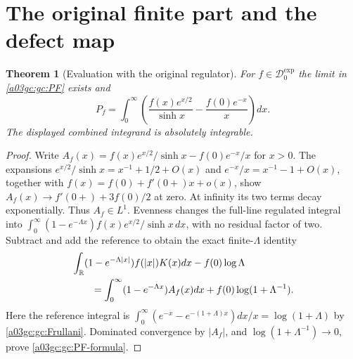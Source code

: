\documentclass[11pt,a4paper]{article}
\newtheorem{theorem}{Theorem}[section]
\begin{document}
\section{The original finite part and the defect map}

\begin{theorem}[Evaluation with the original regulator]
For $f\in\mathcal D_0^{\exp}$ the limit in \eqref{a03gc:gc:PF} exists and
\begin{equation}
 \boxed{\displaystyle
 P_f=\int_0^\infty\left(
       \frac{f(x)e^{x/2}}{\sinh x}-\frac{f(0)e^{-x}}{x}\right)dx.}
 \label{a03gc:gc:PF-formula}
\end{equation}
The displayed combined integrand is absolutely integrable.
\end{theorem}
\begin{proof}
Write $A_f(x)=f(x)e^{x/2}/\sinh x-f(0)e^{-x}/x$ for $x>0$.
The expansions
$e^{x/2}/\sinh x=x^{-1}+1/2+O(x)$ and
$e^{-x}/x=x^{-1}-1+O(x)$, together with
$f(x)=f(0)+f'(0+)x+o(x)$, show
$A_f(x)\to f'(0+)+3f(0)/2$ at zero.
At infinity its two terms decay exponentially.  Thus $A_f\in L^1$.
Evenness changes the full-line regulated integral into
$\int_0^\infty(1-e^{-\Lambda x})f(x)e^{x/2}/\sinh x\,dx$,
with no residual factor of two.  Subtract and add the reference to obtain
the exact finite-$\Lambda$ identity
\begin{align}
 &\int_\mathbb R(1-e^{-\Lambda|x|})f(|x|)K(x)dx-f(0)\log\Lambda\notag\\
 &\qquad=\int_0^\infty(1-e^{-\Lambda x})A_f(x)dx
              +f(0)\log(1+\Lambda^{-1}).
 \label{a03gc:gc:finite-regulator}
\end{align}
Here the reference integral is
$\int_0^\infty(e^{-x}-e^{-(1+\Lambda)x})dx/x=\log(1+\Lambda)$
by \eqref{a03gc:gc:Frullani}.  Dominated convergence by $|A_f|$, and
$\log(1+\Lambda^{-1})\to0$, prove \eqref{a03gc:gc:PF-formula}.
\end{proof}
\end{document}
